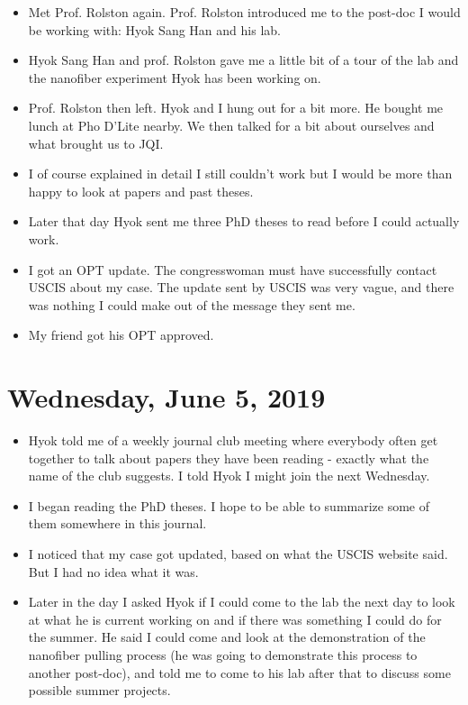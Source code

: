 \documentclass{book}
\theoremstyle{definition}
\begin{document}
\begin{itemize}
	\item Met Prof. Rolston again. Prof. Rolston introduced me to the post-doc I would be working with: Hyok Sang Han and his lab.
	\item Hyok Sang Han and prof. Rolston gave me a little bit of a tour of the lab and the nanofiber experiment Hyok has been working on. 
	\item Prof. Rolston then left. Hyok and I hung out for a bit more. He bought me lunch at Pho D'Lite nearby. We then talked for a bit about ourselves and what brought us to JQI.
	\item I of course explained in detail I still couldn't work but I would be more than happy to look at papers and past theses.
	\item Later that day Hyok sent me three PhD theses to read before I could actually work. 
	\item I got an OPT update. The congresswoman must have successfully contact USCIS about my case. The update sent by USCIS was very vague, and there was nothing I could make out of the message they sent me. 
	\item My friend got his OPT approved.
\end{itemize}





\section*{Wednesday, June 5, 2019}
\begin{itemize}
	\item Hyok told me of a weekly journal club meeting where everybody often get together to talk about papers they have been reading - exactly what the name of the club suggests. I told Hyok I might join the next Wednesday.
	\item I began reading the PhD theses. I hope to be able to summarize some of them somewhere in this journal.
	\item I noticed that my case got updated, based on what the USCIS website said. But I had no idea what it was.  
	\item Later in the day I asked Hyok if I could come to the lab the next day to look at what he is current working on and if there was something I could do for the summer. He said I could come and look at the demonstration of the nanofiber pulling process (he was going to demonstrate this process to another post-doc), and told me to come to his lab after that to discuss some possible summer projects. 
\end{itemize}
\end{document}
